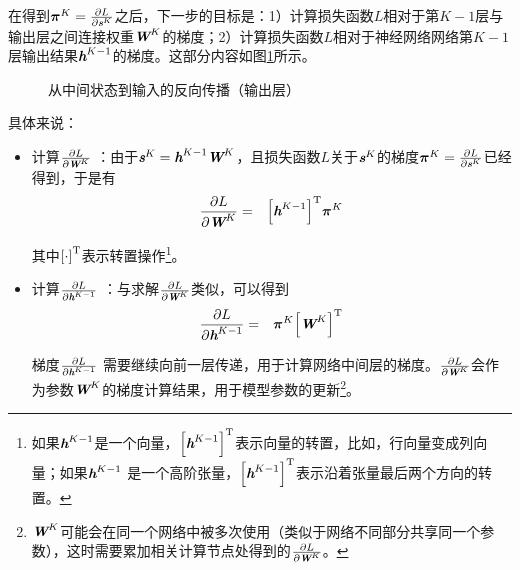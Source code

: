 \parinterval  在得到$ {\bm \pi}^K= \frac{\partial L}{\partial {\textbf{\em s}}^K} $之后，下一步的目标是：1）计算损失函数$ L $相对于第$ K-1 $层与输出层之间连接权重$ {\textbf{\em W}}^K $的梯度；2）计算损失函数$ L $相对于神经网络网络第$ K-1 $层输出结果$ {\textbf{\em h}}^{K-1} $的梯度。这部分内容如图\ref{fig:9-55}所示。

\begin{figure}[htp]
\centering

\caption{从中间状态到输入的反向传播（输出层）}
\label{fig:9-55}
\end{figure}

\noindent  具体来说：

\begin{itemize}
\vspace{0.5em}
\item 计算$ \frac{\partial L}{\partial {\textbf{\em W}}^K} $ ：由于$ {\textbf{\em s}}^K={\textbf{\em h}}^{K-1}{\textbf{\em W}}^K $，且损失函数$ L $关于$ {\textbf{\em s}}^K $的梯度$ {\bm \pi}^K= \frac{\partial L}{\partial {\textbf{\em s}}^K} $已经得到，于是有
\begin{eqnarray}
\frac{\partial L}{\partial {\textbf{\em W}}^K}&=&{\left[{\textbf{\em h}}^{K-1}\right]}^{\textrm T} {\bm \pi}^K
\label{eq:9-50}
\end{eqnarray}

其中${[\cdot]}^{\textrm T}$表示转置操作\footnote{如果$ {\textbf{\em h}}^{K-1} $是一个向量，$ {\left[{\textbf{\em h}}^{K-1}\right]}^{\textrm T} $表示向量的转置，比如，行向量变成列向量；如果$ {\textbf{\em h}}^{K-1} $ 是一个高阶张量，$ {\left[{\textbf{\em h}}^{K-1}\right]}^{\textrm T} $表示沿着张量最后两个方向的转置。}。
\vspace{0.5em}
\item 计算$ \frac{\partial L}{\partial{\textbf{\em h}}^{K-1}} $ ：与求解$ \frac{\partial L}{\partial {\textbf{\em W}}^K} $类似，可以得到
\begin{eqnarray}
\frac{\partial L}{\partial {\textbf{\em h}}^{K-1}}&=&{\bm \pi}^K{\left[{\textbf{\em W}}^K\right]}^{\textrm T}
\label{eq:9-51}
\end{eqnarray}

梯度$ \frac{\partial L}{\partial {\textbf{\em h}}^{K-1}} $ 需要继续向前一层传递，用于计算网络中间层的梯度。$ \frac{\partial L}{\partial {\textbf{\em W}}^K} $会作为参数$ {\textbf{\em W}}^K $的梯度计算结果，用于模型参数的更新\footnote{$ {\textbf{\em W}}^K $可能会在同一个网络中被多次使用（类似于网络不同部分共享同一个参数），这时需要累加相关计算节点处得到的$ \frac{\partial L}{\partial {\textbf{\em W}}^K} $。}。
\vspace{0.5em}
\end{itemize}

